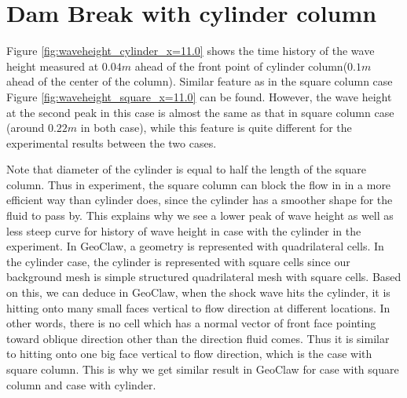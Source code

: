 \documentclass[11pt]{article}
\begin{document}
\section{Dam Break with cylinder column}\label{Sec:Cylinder}
Figure \ref{fig:waveheight_cylinder_x=11.0} shows the time history of the wave height measured at $0.04m$ ahead of the front point of cylinder column($0.1m$ ahead of the center of the column).
Similar feature as in the square column case Figure \ref{fig:waveheight_square_x=11.0} can be found.
However, the wave height at the second peak in this case is almost the same as that in square column case (around $0.22m$ in both case), while this feature is quite different for the experimental results between the two cases.
\par
Note that diameter of the cylinder is equal to half the length of the square column. 
Thus in experiment, the square column can block the flow in in a more efficient way than cylinder does, since the cylinder has a smoother shape for the fluid to pass by. 
This explains why we see a lower peak of wave height as well as less steep curve for history of wave height in case with the cylinder in the experiment. 
In GeoClaw, a geometry is represented with quadrilateral cells. 
In the cylinder case, the cylinder is represented with square cells since our background mesh is simple structured quadrilateral mesh with square cells.
Based on this, we can deduce in GeoClaw, when the shock wave hits the cylinder, it is hitting onto many small faces vertical to flow direction at different locations. 
In other words, there is no cell which has a normal vector of front face pointing toward oblique direction other than the direction fluid comes.  
Thus it is similar to hitting onto one big face vertical to flow direction, which is the case with square column.  
This is why we get similar result in GeoClaw for case with square column and case with cylinder.
\end{document}
